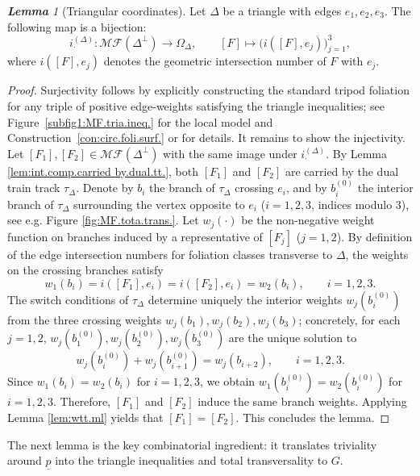 \documentclass[11pt, letterpaper]{amsart}
\theoremstyle{definition}
\theoremstyle{remark}
\newtheorem{lemma}[theorem]{\rm\bf Lemma}
\newcommand{\up}{\underline{p}}
\newcommand{\cMF}{\mathcal{MF}}
\numberwithin{equation}{section}
\begin{document}
\begin{lemma}[Triangular coordinates]
\label{lem:MF.triang.ineq.bij}
Let $\Delta$ be a triangle with edges $e_1,e_2,e_3$.
The following map is a bijection:
\[
i^{(\Delta)}_{\cdot} : \cMF(\Delta^{\perp}) \longrightarrow \Omega_{\Delta},
\qquad
[F] \longmapsto \big(i([F],e_j)\big)_{j=1}^3,
\]
where $i([F],e_j)$ denotes the geometric intersection number of $F$ with $e_j$.
\end{lemma}

\begin{proof}
Surjectivity follows by explicitly constructing the standard tripod foliation
for any triple of positive edge-weights satisfying the triangle inequalities;
see Figure~\ref{subfig1:MF.tria.ineq.} for the local model and
Construction~\ref{con:circ.foli.surf.} or \cite[Case~0]{Mos88} for details.
It remains to show the injectivity. Let \([F_1], [F_2]\in\cMF(\Delta^{\perp})\) with the same image under $i^{(\Delta)}_{\cdot}$.  By Lemma \ref{lem:int.comp.carried by.dual.tt.}, both \([F_1]\) and \([F_2]\) are carried by the dual train track $\tau_{\Delta}$.
Denote by \(b_i\) the branch of \(\tau_{\Delta}\) crossing \(e_i\),
and by \(b^{(0)}_i\) the interior branch of \(\tau_{\Delta}\) surrounding the vertex opposite to \(e_i\) (\(i=1,2,3\), indices modulo \(3\)), see e.g. Figure \ref{fig:MF.tota.trans.}.
Let \(w_j(\cdot)\) be the non-negative weight function on branches induced by a representative of \([F_j]\) (\(j=1,2\)).
By definition of the edge intersection numbers for foliation classes transverse to \(\Delta\), the weights on the crossing branches satisfy
\[
w_1(b_i)= i([F_1],e_i) = i([F_2],e_i)= w_2(b_i), \qquad i=1,2,3.
\]
The switch conditions of \(\tau_{\Delta}\) determine uniquely the interior weights \(w_j(b^{(0)}_i)\) from the three crossing weights \(w_j(b_1),w_j(b_2),w_j(b_3)\); concretely, for each \(j=1,2\), \(w_j(b^{(0)}_1),w_j(b^{(0)}_2),w_j(b^{(0)}_3)\) are the unique solution to
\[
w_j(b^{(0)}_i) + w_j(b^{(0)}_{i+1}) = w_j(b_{i+2}), \qquad i=1,2,3.
\]
Since \(w_1(b_i)=w_2(b_i)\) for \(i=1,2,3\), we obtain \(w_1(b^{(0)}_i)=w_2(b^{(0)}_i)\) for \(i=1,2,3\). Therefore,  \([F_1]\) and \([F_2]\)  induce the same branch weights.
Applying Lemma \ref{lem:wtt.ml} yields that $[F_1]=[F_2]$. This concludes the lemma.
\end{proof}




The next lemma is the key combinatorial ingredient: it translates triviality around \(\up\) into the triangle inequalities and total transversality to \(G\).
\end{document}
